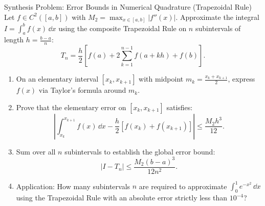 \begin{exercise}{Synthesis Problem: Error Bounds in Numerical Quadrature (Trapezoidal Rule)}
Let $f \in C^2([a, b])$ with $M_2 = \max_{x \in [a, b]} |f''(x)|$.
Approximate the integral $I = \int_a^b f(x)\,\dd x$ using the composite Trapezoidal Rule on $n$ subintervals of length $h = \frac{b - a}{n}$:
\[
T_n = \frac{h}{2} \left[ f(a) + 2\sum_{k=1}^{n-1} f(a + kh) + f(b) \right].
\]
\begin{enumerate}[leftmargin=1.5em,itemsep=2pt]
  \item On an elementary interval $[x_k, x_{k+1}]$ with midpoint $m_k = \frac{x_k + x_{k+1}}{2}$, express $f(x)$ via Taylor's formula around $m_k$.
  \item Prove that the elementary error on $[x_k, x_{k+1}]$ satisfies:
  \[
  \left| \int_{x_k}^{x_{k+1}} f(x)\,\dd x - \frac{h}{2}[f(x_k) + f(x_{k+1})] \right| \le \frac{M_2 h^3}{12}.
  \]
  \item Sum over all $n$ subintervals to establish the global error bound:
  \[
  |I - T_n| \le \frac{M_2 (b - a)^3}{12 n^2}.
  \]
  \item Application: How many subintervals $n$ are required to approximate $\int_0^1 e^{-x^2}\,\dd x$ using the Trapezoidal Rule with an absolute error strictly less than $10^{-4}$?
\end{enumerate}
\end{exercise}

\begin{tabletworkspace}[5.5cm]
\end{tabletworkspace}

